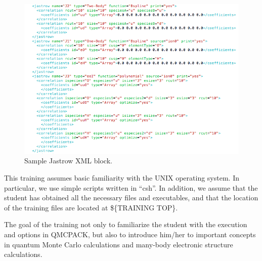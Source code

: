 \begin{figure}[ht!]
\begin{center}
\includegraphics[trim = 0mm 0mm 0mm 0mm, clip,width=1.0\columnwidth]{figures/lab_advanced_molecules_xml_jastrow.png}
\end{center}
\caption{Sample Jastrow XML block.}
\label{fig:lam_xml_jastrow}
\end{figure}

This training assumes basic familiarity with the UNIX operating system. In particular,
we use simple scripts written in “csh”. In addition, we assume that the student has obtained
all the necessary files and executables, and that the location of the training files are located
at \$\{TRAINING TOP\}.

The goal of the training not only to familiarize the student with the execution and
options in QMCPACK, but also to introduce him/her to important concepts in quantum
Monte Carlo calculations and many-body electronic structure calculations.


